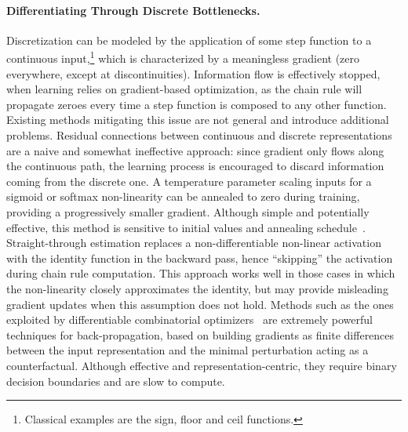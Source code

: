 \paragraph{Differentiating Through Discrete Bottlenecks.}
Discretization can be modeled by the application of some step function to a continuous input,\footnote{Classical examples are the sign, floor and ceil functions.} which is characterized by a meaningless gradient (zero everywhere, except at discontinuities).
Information flow is effectively stopped, when learning relies on gradient-based optimization, as the chain rule will propagate zeroes every time a step function is composed to any other function.
%
Existing methods mitigating this issue are not general and introduce additional problems.
Residual connections between continuous and discrete representations are a naive and somewhat ineffective approach: since gradient only flows along the continuous path, the learning process is encouraged to discard information coming from the discrete one.
A temperature parameter scaling inputs for a sigmoid or softmax non-linearity can be annealed to zero during training, providing a progressively smaller gradient. Although simple and potentially effective, this method is sensitive to initial values and annealing schedule~\cite{kaiser2018discrete}.
Straight-through estimation replaces a non-differentiable non-linear activation with the identity function in the backward pass, hence ``skipping'' the activation during chain rule computation. This approach works well in those cases in which the non-linearity closely approximates the identity,
but may provide misleading gradient updates when this assumption does not hold.
Methods such as the ones exploited by differentiable combinatorial optimizers~\cite{fredrikson2023learning} are extremely powerful techniques for back-propagation, based on building gradients as finite differences between the input representation and the minimal perturbation acting as a counterfactual. Although effective and representation-centric, they require binary decision boundaries and are slow to compute.

